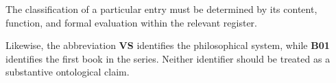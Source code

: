 The classification of a particular entry must be determined by its
content, function, and formal evaluation within the relevant register.

Likewise, the abbreviation \textbf{VS} identifies the philosophical
system, while \textbf{B01} identifies the first book in the series.
Neither identifier should be treated as a substantive ontological claim.


